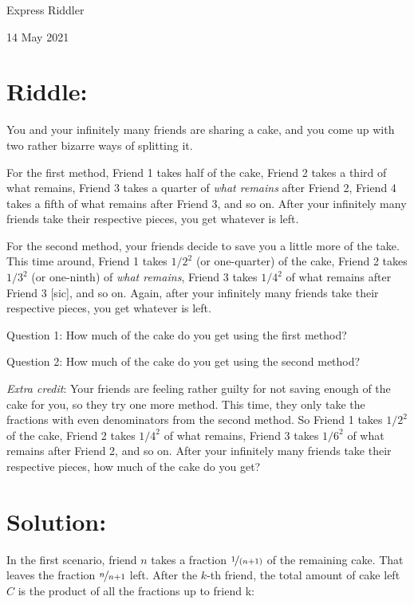 \documentclass{article}
\begin{document}
\pagestyle{empty} %

\begin{center}
{\LARGE Express Riddler}

\vspace{0.15in}

{\Large 14 May 2021}
\end{center}


\section*{Riddle:}

You and your infinitely many friends are sharing a cake, and you come up with two rather bizarre ways of splitting it.

For the first method, Friend 1 takes half of the cake, Friend 2 takes a third of what remains, Friend 3 takes a quarter of \textit{what remains} after Friend 2, Friend 4 takes a fifth of what remains after Friend 3, and so on.
After your infinitely many friends take their respective pieces, you get whatever is left.

For the second method, your friends decide to save you a little more of the take.
This time around, Friend 1 takes $1/2^{2}$ (or one-quarter) of the cake, Friend 2 takes $1/3^{2}$ (or one-ninth) of \textit{what remains}, Friend 3 takes $1/4^{2}$ of what remains after Friend 3 [sic], and so on.
Again, after your infinitely many friends take their respective pieces, you get whatever is left.

Question 1: How much of the cake do you get using the first method?

Question 2: How much of the cake do you get using the second method?

\textit{Extra credit}: Your friends are feeling rather guilty for not saving enough of the cake for you, so they try one more method. This time, they only take the fractions with even denominators from the second method. So Friend 1 takes $1/2^{2}$ of the cake, Friend 2 takes $1/4^{2}$ of what remains, Friend 3 takes $1/6^{2}$ of what remains after Friend 2, and so on.
After your infinitely many friends take their respective pieces, how much of the cake do you get?


\section*{Solution:}

In the first scenario, friend $n$ takes a fraction $\nicefrac{1}{(n+1)}$ of the remaining cake.
That leaves the fraction $\nicefrac{n}{n+1}$ left.
After the $k$-th friend, the total amount of cake left $C$ is the product of all the fractions up to friend k:
\end{document}
